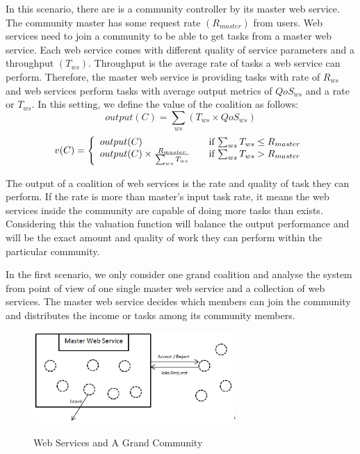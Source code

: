 \documentclass[10pt, conference, compsocconf]{IEEEtran}
\theoremstyle{plain}
\theoremstyle{definition}
\begin{document}
In this scenario, there are is a community controller by its master web service. The community master has some request rate $(R_{master})$ from users. Web services need to join a community to be able to get tasks from a master web service. Each web service comes with different quality of service parameters and a throughput $(T_{ws})$. Throughput is the average rate of tasks a web service can perform. Therefore, the master web service is providing tasks with rate of $R_{ws}$ and web services perform tasks with average output metrics of $QoS_{ws}$ and a rate or $T_{ws}$. 
In this setting, we define the value of the coalition as follows:
\begin{equation*}
output(C) = \sum_{ws}{(T_{ws} \times QoS_{ws})}
\end{equation*}
\setlength{\abovedisplayshortskip}{2pt}
\begin{equation*}
v(C) = \left\{ 
  \begin{array}{l l}
    output(C) & \quad \text{if $\sum_{ws}{T_{ws}} \leq R_{master}$}\\
    output(C) \times \frac{R_{master}}{\sum_{ws}{T_{ws}}} & \quad \text{if $\sum_{ws}{T_{ws}} > R_{master}$}
  \end{array} \right.
\end{equation*}  

The output of a coalition of web services is the rate and quality of task they can perform. If the rate is more than master's input task rate, it means the web services inside the community are capable of doing more tasks than exists. Considering this the valuation function will balance the output performance and will be the exact amount and quality of work they can perform within the particular community. %

In the first scenario, we only consider one grand coalition and analyse the system from point of view of one single master web service and a collection of web services. The master web service decides which members can join %
the community and distributes the income or tasks among its community members.

\begin{figure}[!t]
\centering
\includegraphics[width=3in]{s1.eps}`
\caption{Web Services and A Grand Community}
\label{fig_sim}
\end{figure}
\end{document}

